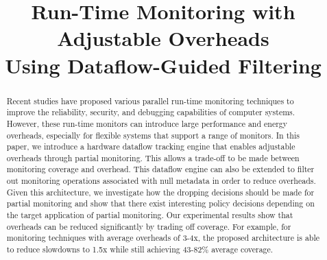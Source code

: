 \title{
Run-Time Monitoring with Adjustable Overheads \\Using Dataflow-Guided Filtering
}

{\author{
}
}

\maketitle

\thispagestyle{empty}

\begin{abstract}

Recent studies have proposed various parallel run-time monitoring techniques to
improve the reliability, security, and debugging capabilities of computer
systems. However, these run-time monitors can introduce large performance and energy
overheads, especially for flexible systems that support a range of monitors.
In this paper, we introduce a hardware dataflow tracking engine that enables
adjustable overheads through partial monitoring. This allows a trade-off to be
made between monitoring coverage and overhead. This dataflow engine
can also be extended to filter out monitoring operations associated with null
metadata in order to reduce overheads.
Given this architecture, we investigate how the dropping decisions should be
made for partial monitoring and show that there exist interesting policy
decisions depending on the target application of partial monitoring.
Our experimental results show that overheads can be reduced significantly 
by trading off coverage. For example, for monitoring techniques with average
overheads of 3-4x, the proposed architecture is able to reduce slowdowns to
1.5x while still achieving 43-82\% average coverage. 

\end{abstract}
